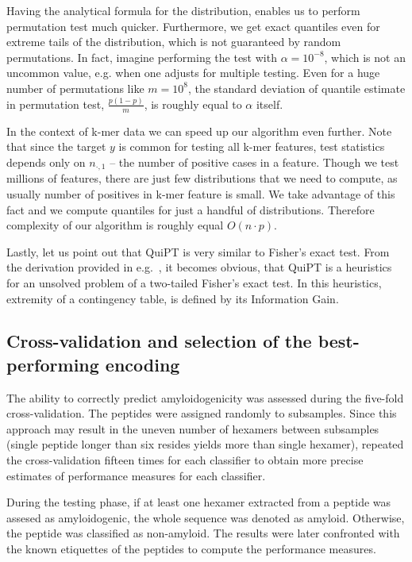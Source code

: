 \documentclass[a4,center,fleqn]{NAR}
\begin{document}
  Having the analytical formula for the distribution, enables us to perform 
permutation test much quicker. Furthermore, we get exact quantiles even for 
extreme tails of the distribution, which is not guaranteed by random 
permutations. In fact, imagine performing the test with $\alpha=10^{-8}$, which 
is not an uncommon value, e.g. when one adjusts for multiple testing. Even for a 
huge number of permutations like $m=10^8$, the standard deviation of quantile 
estimate in permutation test, $\frac{p(1-p)}{m}$, is roughly equal to $\alpha$ 
itself.

  In the context of k-mer data we can speed up our algorithm even further. Note 
that since the target $y$ is common for testing all k-mer features, test 
statistics depends only on $n_{\cdot, 1}$ -- the number of positive cases in a 
feature. Though we test millions of features, there are just few distributions 
that we need to compute, as usually number of positives in k-mer feature is 
small. We take advantage of this fact and we compute quantiles for just a 
handful of distributions. Therefore complexity of our algorithm is roughly equal 
$O(n\cdot p)$.

  Lastly, let us point out that QuiPT is very similar to Fisher's exact test. 
From the derivation provided in e.g.~\citep{lehmann_testing_2008}, it becomes 
obvious, that QuiPT is a heuristics for an unsolved problem of a two-tailed 
Fisher's exact test. In this heuristics, extremity of a contingency table, is 
defined by its Information Gain.

\subsection{Cross-validation and selection of the best-performing encoding}

The ability to correctly predict amyloidogenicity was assessed during the 
five-fold cross-validation. The peptides were assigned randomly to 
subsamples. Since this approach may result in the uneven number of hexamers 
between subsamples (single peptide longer than six resides yields more than 
single hexamer), repeated the cross-validation fifteen times for each classifier 
to obtain more precise estimates of performance measures for each classifier. 

  During the testing phase, if at least one hexamer extracted from a peptide was 
assesed as amyloidogenic, the whole sequence was denoted as amyloid. Otherwise,
the peptide was classified as non-amyloid. The results were later confronted with 
the known etiquettes of the peptides to compute the performance measures.
\end{document}
